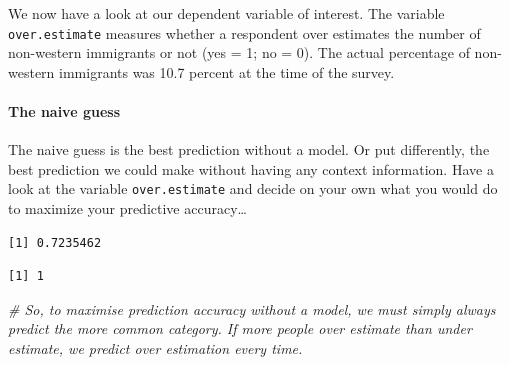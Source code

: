 \documentclass[]{article}
\newenvironment{Shaded}{\begin{snugshade}}{\end{snugshade}}
\newcommand{\CommentTok}[1]{\textcolor[rgb]{0.56,0.35,0.01}{\textit{#1}}}
\newcommand{\DataTypeTok}[1]{\textcolor[rgb]{0.13,0.29,0.53}{#1}}
\newcommand{\DecValTok}[1]{\textcolor[rgb]{0.00,0.00,0.81}{#1}}
\newcommand{\FloatTok}[1]{\textcolor[rgb]{0.00,0.00,0.81}{#1}}
\newcommand{\KeywordTok}[1]{\textcolor[rgb]{0.13,0.29,0.53}{\textbf{#1}}}
\newcommand{\NormalTok}[1]{#1}
\newcommand{\OperatorTok}[1]{\textcolor[rgb]{0.81,0.36,0.00}{\textbf{#1}}}
\newcommand{\StringTok}[1]{\textcolor[rgb]{0.31,0.60,0.02}{#1}}
\let\oldparagraph\paragraph
\renewcommand{\paragraph}[1]{\oldparagraph{#1}\mbox{}}
\begin{document}
We now have a look at our dependent variable of interest. The variable \texttt{over.estimate} measures whether a respondent over estimates the number of non-western immigrants or not (yes = 1; no = 0). The actual percentage of non-western immigrants was 10.7 percent at the time of the survey.

\hypertarget{the-naive-guess}{%
\paragraph{The naive guess}\label{the-naive-guess}}

The naive guess is the best prediction without a model. Or put differently, the best prediction we could make without having any context information. Have a look at the variable \texttt{over.estimate} and decide on your own what you would do to maximize your predictive accuracy\ldots{}

\begin{Shaded}
\end{Shaded}

\begin{verbatim}
[1] 0.7235462
\end{verbatim}

\begin{Shaded}
\end{Shaded}

\begin{verbatim}
[1] 1
\end{verbatim}

\begin{Shaded}
\begin{Highlighting}[]
\CommentTok{# So, to maximise prediction accuracy without a model, we must simply always predict the more common category. If more people over estimate than under estimate, we predict over estimation every time.}
\end{Highlighting}
\end{Shaded}
\end{document}
